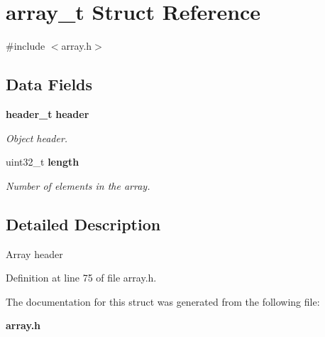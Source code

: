 \section{array\_\-t Struct Reference}
\label{structarray__t}


{\ttfamily \#include $<$array.h$>$}

\subsection*{Data Fields}
\begin{DoxyCompactItemize}
\item 
{\bf header\_\-t} {\bf header}\label{structarray__t_a0b04b1eae80aefdae0200ac7083a8695}

\begin{DoxyCompactList}\small\item\em Object header. \item\end{DoxyCompactList}\item 
uint32\_\-t {\bf length}\label{structarray__t_acc4c0bab2a83d5b134891f445d37a5bf}

\begin{DoxyCompactList}\small\item\em Number of elements in the array. \item\end{DoxyCompactList}\end{DoxyCompactItemize}


\subsection{Detailed Description}
Array header 

Definition at line 75 of file array.h.



The documentation for this struct was generated from the following file:\begin{DoxyCompactItemize}
\item 
{\bf array.h}\end{DoxyCompactItemize}
